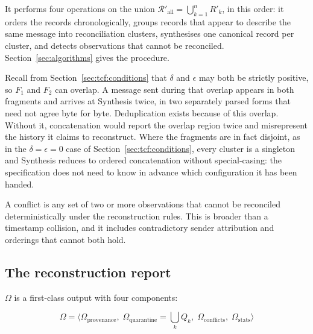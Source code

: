 It performs four operations on the union
$\mathcal{R}'_{\text{all}} = \bigcup_{k=1}^{n} R'_k$, in this order: it orders the
records chronologically, groups records that appear to describe the same message
into reconciliation clusters, synthesises one canonical record per cluster, and
detects observations that cannot be reconciled. Section~\ref{sec:algorithms}
gives the procedure.

Recall from Section~\ref{sec:tcf:conditions} that $\delta$ and $\epsilon$ may both
be strictly positive, so $F_1$ and $F_2$ can overlap. A message sent during that
overlap appears in both fragments and arrives at Synthesis twice, in two
separately parsed forms that need not agree byte for byte. Deduplication exists
because of this overlap. Without it, concatenation would report the overlap region
twice and misrepresent the history it claims to reconstruct. Where the fragments
are in fact disjoint, as in the $\delta = \epsilon = 0$ case of
Section~\ref{sec:tcf:conditions}, every cluster is a singleton and Synthesis
reduces to ordered concatenation without special-casing: the specification does
not need to know in advance which configuration it has been handed.

A conflict is any set of two or more observations that cannot be reconciled
deterministically under the reconstruction rules. This is broader than a timestamp
collision, and it includes contradictory sender attribution and orderings that
cannot both hold.

\subsection{The reconstruction report}
\label{sec:carta:report}

$\Omega$ is a first-class output with four components:

\begin{equation}
  \Omega = \big\langle
    \Omega_{\text{provenance}},\;
    \Omega_{\text{quarantine}} = \textstyle\bigcup_k Q_k,\;
    \Omega_{\text{conflicts}},\;
    \Omega_{\text{stats}}
  \big\rangle
  \label{eq:omega}
\end{equation}

